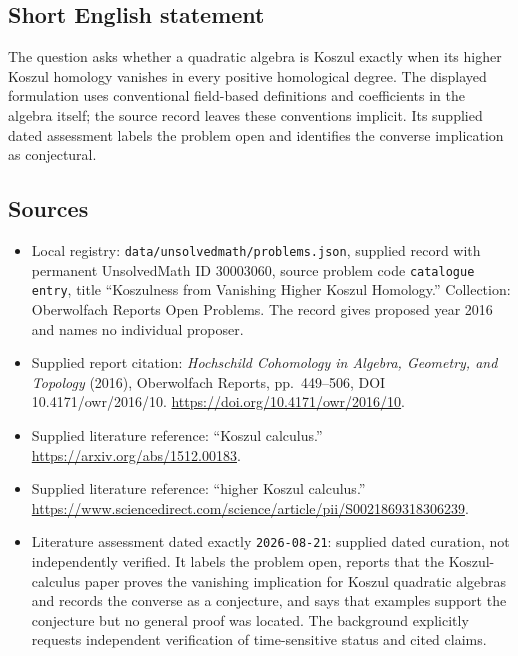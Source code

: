 \documentclass[11pt]{article}
\begin{document}
\subsection{Short English statement}
The question asks whether a quadratic algebra is Koszul exactly when its higher Koszul homology vanishes in every positive homological degree. The displayed formulation uses conventional field-based definitions and coefficients in the algebra itself; the source record leaves these conventions implicit. Its supplied dated assessment labels the problem open and identifies the converse implication as conjectural.
\subsection{Sources}
\begin{itemize}
\item Local registry: \texttt{data/unsolvedmath/problems.json}, supplied record with permanent UnsolvedMath ID \(30003060\), source problem code \texttt{catalogue entry}, title ``Koszulness from Vanishing Higher Koszul Homology.'' Collection: Oberwolfach Reports Open Problems. The record gives proposed year 2016 and names no individual proposer.
\item Supplied report citation: \emph{Hochschild Cohomology in Algebra, Geometry, and Topology} (2016), Oberwolfach Reports, pp.\ 449--506, DOI 10.4171/owr/2016/10. \url{https://doi.org/10.4171/owr/2016/10}.
\item Supplied literature reference: ``Koszul calculus.'' \url{https://arxiv.org/abs/1512.00183}.
\item Supplied literature reference: ``higher Koszul calculus.'' \url{https://www.sciencedirect.com/science/article/pii/S0021869318306239}.
\item Literature assessment dated exactly \texttt{2026-08-21}: supplied dated curation, not independently verified. It labels the problem open, reports that the Koszul-calculus paper proves the vanishing implication for Koszul quadratic algebras and records the converse as a conjecture, and says that examples support the conjecture but no general proof was located. The background explicitly requests independent verification of time-sensitive status and cited claims.
\end{itemize}
\end{document}

